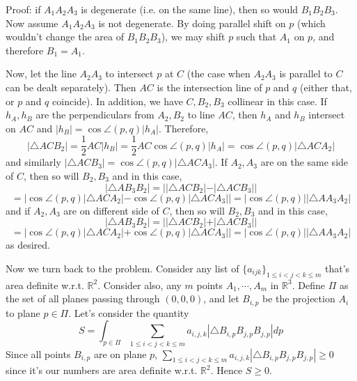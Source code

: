 \documentclass[11pt,a4paper]{article}
\newcommand{\bbR}{\mathbb R}
\newcommand{\<}{\langle}
\renewcommand{\>}{\rangle}
\begin{document}
\begin{enumerate}
	Proof: if $A_1A_2A_3$ is degenerate (i.e. on the same line), 
	then so would $B_1B_2B_3$. 
	Now assume $A_1A_2A_3$ is not degenerate. 
	By doing parallel shift on $p$ (which wouldn't change the area of $B_1B_2B_3$), 
	we may shift $p$ such that $A_1$ on $p$, and therefore $B_1=A_1$. 
	
	Now, let the line $A_2A_3$ to intersect $p$ at $C$ 
	(the case when $A_2A_3$ is parallel to $C$ can be dealt separately). 
	Then $AC$ is the intersection line of $p$ and $q$ (either that, or $p$ and $q$ coincide). 
	In addition, we have $C, B_2, B_3$ collinear in this case. 
	If $h_A, h_B$ are the perpendiculars from $A_2, B_2$ to line $AC$, then 
	$h_A$ and $h_B$ intersect on $AC$ and $|h_B|=\cos\angle(p, q)|h_A|$. 
	Therefore, 
	\[
	|\triangle ACB_2|=\frac 12 AC|h_B|=\frac 12 AC\cos\angle(p, q)|h_A|=\cos\angle(p, q)|\triangle ACA_2|
	\]
	and similarly $|\triangle ACB_3|=\cos\angle(p, q)|\triangle ACA_3|$. 
	If $A_2, A_3$ are on the same side of $C$, then so will $B_2, B_3$ and in this case, 
	\[
	|\triangle AB_3B_2|
	=||\triangle ACB_2| - |\triangle ACB_3||
	\]\[
	=|\cos\angle(p, q)|\triangle ACA_2| - \cos\angle(p, q)|\triangle ACA_3||
	=|\cos\angle(p, q)||\triangle AA_3A_2|
	\]
	and if $A_2, A_3$ are on different side of $C$, then so will $B_2, B_3$ and in this case, 
	\[
	|\triangle AB_3B_2|
	=||\triangle ACB_2| + |\triangle ACB_3||
	\]\[
	=|\cos\angle(p, q)|\triangle ACA_2| + \cos\angle(p, q)|\triangle ACA_3||
	=|\cos\angle(p, q)||\triangle AA_3A_2|
	\]
	as desired. 
	
	Now we turn back to the problem. Consider any list of $\{a_{ijk}\}_{1\le i<j<k\le m}$ that's area definite w.r.t. $\bbR^2$. 
	Consider also, any $m$ points $A_1, \cdots, A_m$ in $\bbR^3$. 
	Define $\Pi$ as the set of all planes passing through $(0, 0, 0)$, 
	and let $B_{i, p}$ be the projection $A_i$ to plane $p\in \Pi$. 
	Let's consider the quantity 
	\[
	S = \int_{p\in \Pi} \sum_{1\le i<j<k\le m}a_{i, j, k}|\triangle B_{i, p}B_{j, p}B_{j, p}|dp
	\]
	Since all points $B_{i, p}$ are on plane $p$, 
	$\sum_{1\le i<j<k\le m}a_{i, j, k}|\triangle B_{i, p}B_{j, p}B_{j, p}|\ge 0$ since it's our numbers are
	area definite w.r.t. $\bbR^2$. 
	Hence $S\ge 0$. 
	

\end{enumerate}
\end{document}
